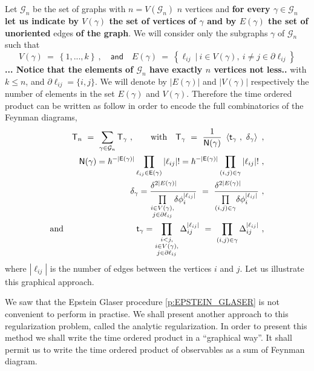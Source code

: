 \documentclass[11pt]{book}
\newcommand{\com}[1]{{\color{red}\bf #1}}
\newcommand{\sbar}[1]{\sout{\color{red} #1}}
\newcommand{\abs}[1]{\left|#1\right|}
\newcommand{\sm}[1]{\left\langle#1\right\rangle}
\newcommand{\Gcal}{\mathcal{G}}
\newcommand{\Esf}{\mathsf{E}}
\newcommand{\Nsf}{\mathsf{N}}
\newcommand{\Tsf}{\mathsf{T}}
\newcommand{\tsf}{\mathsf{t}}
\theoremstyle{break}
\begin{document}
Let $\Gcal_n$ be the set of graphs with \sbar{$n=V(\Gcal_n)$}   \com{$n$} vertices and \com{for every $\gamma\in\Gcal_n$ let us indicate by $V(\gamma)$ the set of vertices of $\gamma$ and by $E(\gamma)$ the set of unoriented} edges \com{of the graph}. We will consider only the subgraphs $\gamma$ of $\Gcal_n$ such that
%
\begin{equation*}
V(\gamma) \ = \ \left\{ 1, ... , k \right\} \ , \quad \mathsf{and} \quad E(\gamma) \ = \ \left\{ \ell_{ij} \ | \  i \in V(\gamma) , \ i\neq j \in \partial \ell_{ij} \right\}
\end{equation*}
\com{ ... Notice that the elements of $\Gcal_n$  have exactly $n$ vertices not less..}
%
with $k\leq n$, and $\partial \ell_{ij} = \{i,j\}$. We will denote by $\abs{E(\gamma)}$ and $\abs{V(\gamma)}$ respectively the number of elements in the set $E(\gamma)$ and $V(\gamma)$. Therefore the time ordered product can be written as follow in order to encode the full combinatorics of the Feynman diagrams,
%
\begin{eqnarray}
&& \Tsf_n \ = \ \sum_{\gamma \in \Gcal_n} \Tsf_\gamma \ , \qquad \mbox{with} \quad \Tsf_\gamma \ = \ \frac{1}{\Nsf(\gamma)} \ \sm{\tsf_\gamma \ , \ \delta_\gamma} \ ,
\label{eq:time_ordered_prod_graph} \\
%
&& \Nsf(\gamma) = \hbar^{-\abs{\Esf(\gamma)}} \prod_{\ell_{ij}\in\Esf(\gamma)} \abs{\ell_{ij}} ! = \hbar^{-\abs{\Esf(\gamma)}} \prod_{(i,j) \in \gamma} \abs{\ell_{ij}} ! \ , \nonumber \\
%
&& \delta_\gamma = \frac{\delta^{2\abs{E(\gamma)}}\hfill}{\underset{\substack{i \in V(\gamma), \\ j \in \partial \ell_{ij}}}{\prod} \delta \phi_i^{\abs{\ell_{ij}}}} \ = \ \frac{\delta^{2\abs{E(\gamma)}}\hfill}{\underset{(i,j)\in\gamma}{\prod} \delta \phi_i^{\abs{\ell_{ij}}}} \ , \nonumber \\
%
\mbox{and} &&\tsf_\gamma = \prod_{\substack{i < j, \\ i \in V(\gamma), \\ j \in \partial \ell_{ij}}} \Delta_{ij}^{\abs{\ell_{ij}}} \ = \ \prod_{(i,j)\in\gamma} \Delta_{ij}^{\abs{\ell_{ij}}} \ , 
%
\label{eq:kernel}
\end{eqnarray}
%
where $\abs{\ell_{ij}}$ is the number of edges between the vertices $i$ and $j$. Let us illustrate this graphical approach. 


\bigskip

We saw that the Epstein Glaser procedure \ref{p:EPSTEIN_GLASER} is not convenient to perform in practise. We shall present another approach to this regularization problem, called the analytic regularization. In order to present this method we shall write the time ordered product in a ``graphical way''. It shall permit us to write the time ordered product of observables as a sum of Feynman diagram. 
\end{document}

